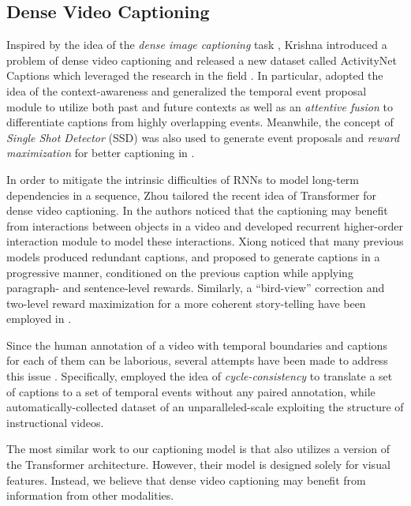 \documentclass[10pt,twocolumn,letterpaper]{article}
\begin{document}
\subsection{Dense Video Captioning}

Inspired by the idea of the \textit{dense image captioning} task \cite{Johnson2016}, Krishna \etal \cite{Krishna2017} introduced a problem of dense video captioning and released a new dataset called ActivityNet Captions which leveraged the research in the field \cite{Zhou2018,Wang2018n,Li2018,Ma2018,Xiong2018,Mun2019,Rahman2019,Xu2019}. In particular, \cite{Wang2018n} adopted the idea of the context-awareness \cite{Krishna2017} and generalized the temporal event proposal module to utilize both past and future contexts as well as an \textit{attentive fusion} to differentiate captions from highly overlapping events. Meanwhile, the concept of \textit{Single Shot Detector} (SSD) \cite{Liu2016} was also used to generate event proposals and \textit{reward maximization} for better captioning in \cite{Li2018}. 

In order to mitigate the intrinsic difficulties of RNNs to model long-term dependencies in a sequence, Zhou \etal \cite{Zhou2018} tailored the recent idea of Transformer \cite{Vaswani2017} for dense video captioning. In \cite{Ma2018} the authors noticed that the captioning may benefit from interactions between objects in a video and developed recurrent higher-order interaction module to model these interactions. Xiong \etal \cite{Xiong2018} noticed that many previous models produced redundant captions, and proposed to generate captions in a progressive manner, conditioned on the previous caption while applying paragraph- and sentence-level rewards. Similarly, a ``bird-view'' correction and two-level reward maximization for a more coherent story-telling have been employed in \cite{Mun2019}.

Since the human annotation of a video with temporal boundaries and captions for each of them can be laborious, several attempts have been made to address this issue \cite{Xuguang2018,Miech2019}. Specifically, \cite{Xuguang2018} employed the idea of \textit{cycle-consistency} to translate a set of captions to a set of temporal events without any paired annotation, while \cite{Miech2019} automatically-collected dataset of an unparalleled-scale exploiting the structure of instructional videos. 

The most similar work to our captioning model is \cite{Zhou2018} that also utilizes a version of the Transformer \cite{Vaswani2017} architecture. However, their model is designed solely for visual features. Instead, we believe that dense video captioning may benefit from information from other modalities. 
\end{document}
